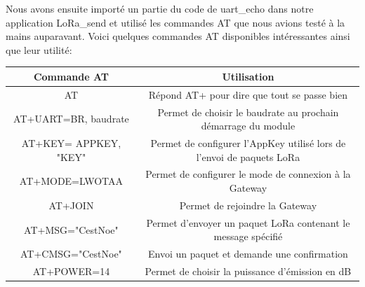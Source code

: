 \documentclass{article}
\begin{document}
		Nous avons ensuite importé un partie du code de uart\_echo dans notre application LoRa\_send et utilisé les commandes AT que nous avions testé à la mains auparavant. Voici quelques commandes AT disponibles intéressantes ainsi que leur utilité:
		\begin{center}
			\begin{tabular}{ ||c|c|| } 
				\hline
				Commande AT & Utilisation \\ [0.5ex]
				\hline \hline
				AT & Répond AT+ pour dire que tout se passe bien \\ 
				AT+UART=BR, {baudrate} & Permet de choisir le baudrate au prochain démarrage du module \\
				AT+KEY= APPKEY, "KEY" & Permet de configurer l'AppKey utilisé lors de l'envoi de paquets LoRa \\
				AT+MODE=LWOTAA & Permet de configurer le mode de connexion à la Gateway \\
				AT+JOIN & Permet de rejoindre la Gateway \\
				AT+MSG="CestNoe" & Permet d'envoyer un paquet LoRa contenant le message spécifié \\
				AT+CMSG="CestNoe" & Envoi un paquet et demande une confirmation \\
				AT+POWER=14 & Permet de choisir la puissance d'émission en dB \\
				\hline
			\end{tabular}
		\end{center}
		
\end{document}
